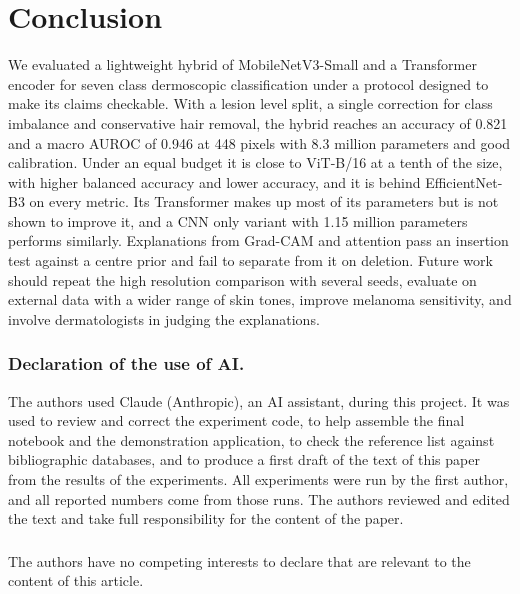 \documentclass[runningheads]{llncs}
\begin{document}
\section{Conclusion}

We evaluated a lightweight hybrid of MobileNetV3-Small and a Transformer encoder for seven class dermoscopic classification under a protocol designed to make its claims checkable. With a lesion level split, a single correction for class imbalance and conservative hair removal, the hybrid reaches an accuracy of 0.821 and a macro AUROC of 0.946 at 448 pixels with 8.3 million parameters and good calibration. Under an equal budget it is close to ViT-B/16 at a tenth of the size, with higher balanced accuracy and lower accuracy, and it is behind EfficientNet-B3 on every metric. Its Transformer makes up most of its parameters but is not shown to improve it, and a CNN only variant with 1.15 million parameters performs similarly. Explanations from Grad-CAM and attention pass an insertion test against a centre prior and fail to separate from it on deletion. Future work should repeat the high resolution comparison with several seeds, evaluate on external data with a wider range of skin tones, improve melanoma sensitivity, and involve dermatologists in judging the explanations.

\begin{credits}
\subsubsection{Declaration of the use of AI.}
The authors used Claude (Anthropic), an AI assistant, during this project. It was used to review and correct the experiment code, to help assemble the final notebook and the demonstration application, to check the reference list against bibliographic databases, and to produce a first draft of the text of this paper from the results of the experiments. All experiments were run by the first author, and all reported numbers come from those runs. The authors reviewed and edited the text and take full responsibility for the content of the paper.

\subsubsection{\discintname}
The authors have no competing interests to declare that are relevant to the content of this article.
\end{credits}
\end{document}
